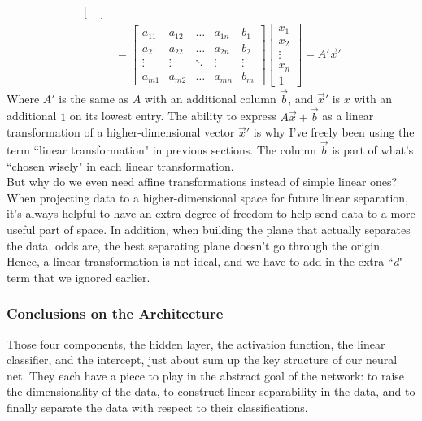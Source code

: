 \documentclass{article}
\begin{document}
\begin{align*}
\begin{bmatrix}
\end{bmatrix} \\
&=
\begin{bmatrix}
a_{11} & a_{12} & \hdots & a_{1n} & b_1 \\
a_{21} & a_{22} & \hdots & a_{2n} & b_2\\
\vdots & \vdots & \ddots & \vdots & \vdots \\
a_{m1} & a_{m2} & \hdots & a_{mn} & b_m
\end{bmatrix}
\begin{bmatrix}
x_1 \\ x_2 \\ \vdots \\ x_n \\ 1
\end{bmatrix}
= A'\vec{x}'
\end{align*}
Where $A'$ is the same as $A$ with an additional column $\vec{b}$, and $\vec{x}'$ is $x$ with an additional $1$ on its lowest entry. The ability to express $A\vec{x}+\vec{b}$ as a linear transformation of a higher-dimensional vector $\vec{x}'$ is why I've freely been using the term ``linear transformation" in previous sections. The column $\vec{b}$ is part of what's ``chosen wisely" in each linear transformation. \\

But why do we even need affine transformations instead of simple linear ones? When projecting data to a higher-dimensional space for future linear separation, it's always helpful to have an extra degree of freedom to help send data to a more useful part of space. In addition, when building the plane that actually separates the data, odds are, the best separating plane doesn't go through the origin. Hence, a linear transformation is not ideal, and we have to add in the extra ``\textit{d}" term that we ignored earlier. \\

\subsubsection{Conclusions on the Architecture}
Those four components, the hidden layer, the activation function, the linear classifier, and the intercept, just about sum up the key structure of our neural net. They each have a piece to play in the abstract goal of the network: to raise the dimensionality of the data, to construct linear separability in the data, and to finally separate the data with respect to their classifications. \\
\end{document}
